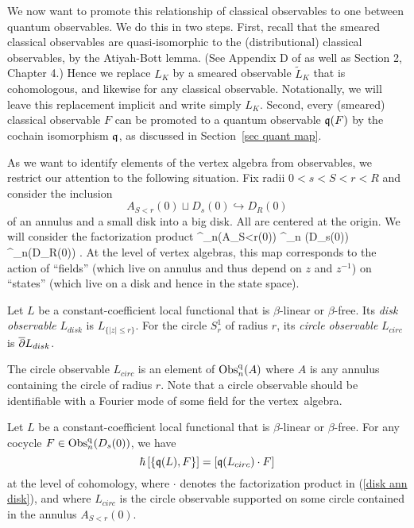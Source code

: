 We now want to promote this relationship of classical observables to one between quantum observables.
We do this in two steps.
First, recall that the smeared classical observables are quasi-isomorphic to the (distributional) classical observables,
by the Atiyah-Bott lemma. (See Appendix D of \cite{CG1} as well as Section 2, Chapter 4.)
Hence we replace $L_K$ by a smeared observable $\widetilde{L}_K$ that is cohomologous, and likewise for any classical observable.
Notationally, we will leave this replacement implicit and write simply $L_K$.
Second, every (smeared) classical observable $F$ can be promoted to a quantum observable $\frak{q}(F)$ 
by the cochain isomorphism $\frak{q}$, as discussed in Section~\ref{sec quant map}.

As we want to identify elements of the vertex algebra from observables,
we restrict our attention to the following situation.
Fix radii $0 < s < S < r <R$ and
consider the inclusion 
\[
A_{S<r}(0) \sqcup D_s(0) \hookrightarrow D_R(0)
\]
of an annulus and a small disk into a big disk.
All are centered at the origin. We will consider the factorization product 
\be\label{disk ann disk}
\Obs^{\q}_n(A_{S<r}(0)) \tensor \Obs^{\q}_n (D_s(0)) \to \Obs^{\q}_n(D_R(0)) .
\ee
At the level of vertex algebras, this map corresponds to the action of ``fields'' (which live on annulus and thus depend on $z$ and $z^{-1}$) on ``states'' (which live on a disk and hence in the state space).

\begin{dfn}
Let $L$ be a constant-coefficient local functional that is $\beta$-linear or $\beta$-free.
Its {\em disk observable} $L_{disk}$ is $L_{\{|z| \leq r\}}$. For the circle $S^1_r$ of radius $r$, its {\em circle observable} $L_{circ}$ is $\overline{\partial} L_{disk}$.
\end{dfn}

The circle observable $L_{circ}$ is an element of ${\rm Obs}^{{\rm q}}_{n}(A)$ where $A$ is any annulus containing the circle of radius $r$. Note that a circle observable should be identifiable with a Fourier mode of some field for the vertex~algebra.

\begin{lemma}
\label{der vs star}
Let $L$ be a constant-coefficient local functional that is $\beta$-linear or $\beta$-free.
For any cocycle $F \in {\rm Obs}^{\rm q}_n(D_s(0))$, we have
\[
\hbar \left[ \{\frak{q}(L) , F\} \right] = \left[\frak{q}(L_{circ}) \cdot F\right]
\]
at the level of cohomology, where $\cdot$ denotes the factorization product in (\ref{disk ann disk}), and where $L_{circ}$ is the circle observable supported on some circle contained in the annulus $A_{S<r}(0)$.
\end{lemma}

